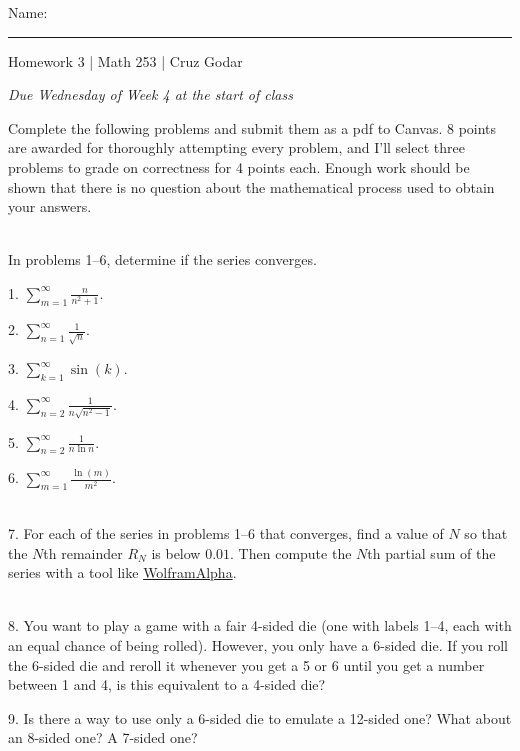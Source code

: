 \documentclass{article}
\begin{document}
\Large Name: \rule{2in}{0.15mm} \hfill Homework 3 | Math 253 | Cruz Godar \vspace{4pt} \normalsize

\textit{Due Wednesday of Week 4 at the start of class}

Complete the following problems and submit them as a pdf to Canvas. 8 points are awarded for thoroughly attempting every problem, and I'll select three problems to grade on correctness for 4 points each. Enough work should be shown that there is no question about the mathematical process used to obtain your answers.

~\\

In problems 1--6, determine if the series converges.

1. $\displaystyle \sum_{m = 1}^\infty \frac{n}{n^2 + 1}$.

2. $\displaystyle \sum_{n = 1}^\infty \frac{1}{\sqrt{n}}$.

3. $\displaystyle \sum_{k = 1}^\infty \sin(k)$.

4. $\displaystyle \sum_{n = 2}^\infty \frac{1}{n \sqrt{n^2 - 1}}$.

5. $\displaystyle \sum_{n = 2}^\infty \frac{1}{n\ln{n}}$.

6. $\displaystyle \sum_{m = 1}^\infty \frac{\ln(m)}{m^2}$.

~\\

7. For each of the series in problems 1--6 that converges, find a value of $N$ so that the $N$th remainder $R_N$ is below $0.01$. Then compute the $N$th partial sum of the series with a tool like \href{https://wolframalpha.com}{WolframAlpha}.

~\\

8. You want to play a game with a fair 4-sided die (one with labels 1--4, each with an equal chance of being rolled). However, you only have a 6-sided die. If you roll the 6-sided die and reroll it whenever you get a 5 or 6 until you get a number between 1 and 4, is this equivalent to a 4-sided die?

9. Is there a way to use only a 6-sided die to emulate a 12-sided one? What about an 8-sided one? A 7-sided one?
\end{document}
